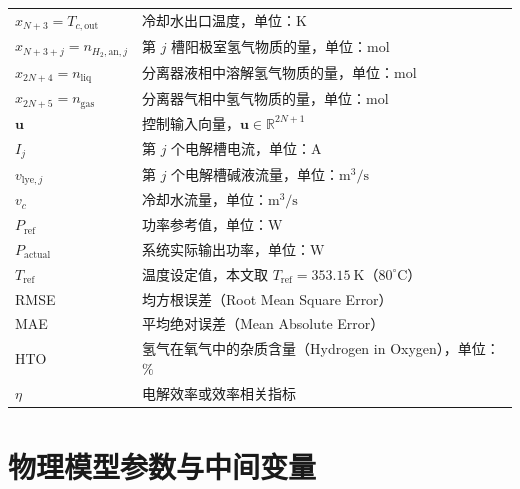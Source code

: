\begin{longtable}{@{}l p{10cm}@{}}
$x_{N+3} = T_{c,\text{out}}$ & 冷却水出口温度，单位：$\mathrm{K}$ \\
$x_{N+3+j} = n_{H_2,\text{an},j}$ & 第 $j$ 槽阳极室氢气物质的量，单位：$\mathrm{mol}$ \\
$x_{2N+4} = n_{\text{liq}}$ & 分离器液相中溶解氢气物质的量，单位：$\mathrm{mol}$ \\
$x_{2N+5} = n_{\text{gas}}$ & 分离器气相中氢气物质的量，单位：$\mathrm{mol}$ \\
\addlinespace
$\mathbf{u}$ & 控制输入向量，$\mathbf{u} \in \mathbb{R}^{2N+1}$ \\
$I_j$ & 第 $j$ 个电解槽电流，单位：$\mathrm{A}$ \\
$v_{\text{lye},j}$ & 第 $j$ 个电解槽碱液流量，单位：$\mathrm{m}^3/\mathrm{s}$ \\
$v_c$ & 冷却水流量，单位：$\mathrm{m}^3/\mathrm{s}$ \\
$P_{\text{ref}}$ & 功率参考值，单位：$\mathrm{W}$ \\
$P_{\text{actual}}$ & 系统实际输出功率，单位：$\mathrm{W}$ \\
$T_{\text{ref}}$ & 温度设定值，本文取 $T_{\text{ref}} = 353.15~\mathrm{K}$（$80^\circ\mathrm{C}$） \\
\addlinespace
RMSE & 均方根误差（Root Mean Square Error） \\
MAE & 平均绝对误差（Mean Absolute Error） \\
HTO & 氢气在氧气中的杂质含量（Hydrogen in Oxygen），单位：$\%$ \\
$\eta$ & 电解效率或效率相关指标 \\
\end{longtable}

\section{物理模型参数与中间变量}

